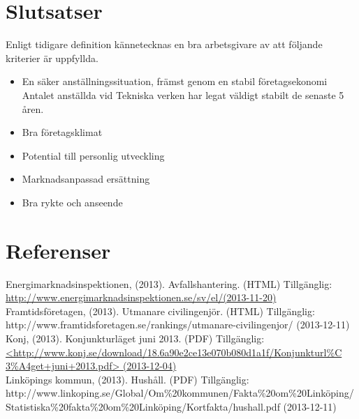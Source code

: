 \documentclass[10pt,a4paper]{article}
\begin{document}
\section{Slutsatser}
Enligt tidigare definition kännetecknas en bra arbetsgivare av att följande kriterier är uppfyllda.

\begin{itemize}
 \item En säker anställningssituation, främst genom en stabil företagsekonomi 
 Antalet anställda vid Tekniska verken har legat väldigt stabilt de senaste 5 åren. 
 \item Bra företagsklimat
 \item Potential till personlig utveckling
 \item Marknadsanpassad ersättning
 \item Bra rykte och anseende
\end{itemize}

\newpage
\section{Referenser}


\hspace{0,5cm}Energimarknadsinspektionen, (2013). Avfallshantering. (HTML) Tillgänglig: \\
\hyperref{http://www.energimarknadsinspektionen.se/sv/el/}{}{}{http://www.energimarknadsinspektionen.se/sv/el/(2013-11-20)}\\

Framtidsföretagen, (2013). Utmanare civilingenjör. (HTML) Tillgänglig: \\
http://www.framtidsforetagen.se/rankings/utmanare-civilingenjor/ (2013-12-11)\\

Konj, (2013). Konjunkturläget juni 2013. (PDF) Tillgänglig:\\
\hyperref{http://www.konj.se/download/18.6a90e2ce13e070b080d1a1f/Konjunkturl\%C3\%A4get+juni+2013.pdf}{}{}{<http://www.konj.se/download/18.6a90e2ce13e070b080d1a1f/Konjunkturl\%C\\3\%A4get+juni+2013.pdf> (2013-12-04)}\\

Linköpings kommun, (2013). Hushåll. (PDF) Tillgänglig:\\
http://www.linkoping.se/Global/Om\%20kommunen/Fakta\%20om\%20Linköping/\\Statistiska\%20fakta\%20om\%20Linköping/Kortfakta/hushall.pdf (2013-12-11)\\
\end{document}
